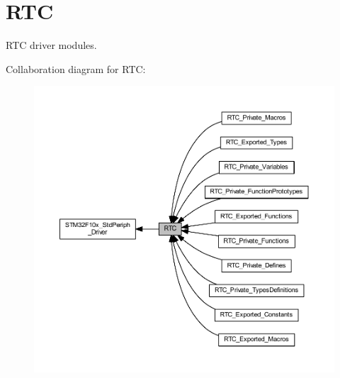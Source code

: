 \hypertarget{group___r_t_c}{}\section{R\+TC}
\label{group___r_t_c}


R\+TC driver modules.  


Collaboration diagram for R\+TC\+:
\nopagebreak
\begin{figure}[H]
\begin{center}
\leavevmode
\includegraphics[width=350pt]{group___r_t_c}
\end{center}
\end{figure}
